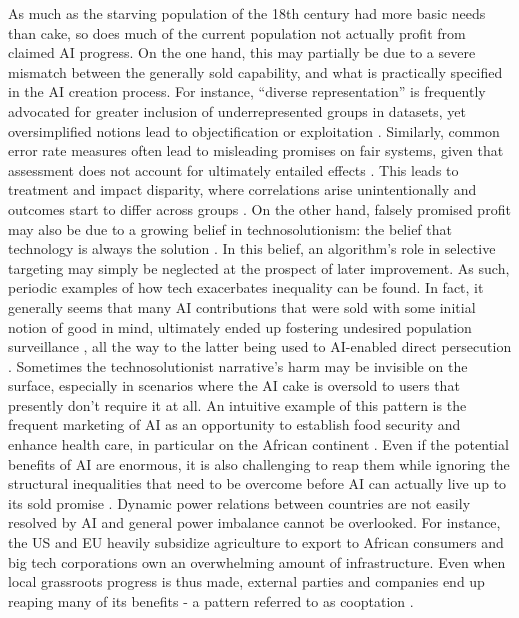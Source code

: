\documentclass[manuscript,screen,authorversion,nonacm]{acmart}
\begin{document}
As much as the starving population of the 18th century had more basic needs than cake, so does much of the current population not actually profit from claimed AI progress. On the one hand, this may partially be due to a severe mismatch between the generally sold capability, and what is practically specified in the AI creation process. For instance, ``diverse representation'' is frequently advocated for greater inclusion of underrepresented groups in datasets, yet oversimplified notions lead to objectification or exploitation \cite{Bergman2023RepresentationAIEval,Chien2024RepresentationalHarms}. Similarly, common error rate measures often lead to misleading promises on fair systems, given that assessment does not account for ultimately entailed effects \cite{Corbettdavies2023MismeasureFairness}. This leads to treatment and impact disparity, where correlations arise unintentionally and outcomes start to differ across groups \cite{Lipton2019MLDisparity}. On the  other hand, falsely promised profit may also be due to a growing belief in technosolutionism: the belief that technology is always the solution \cite{Broussard2019ArtificialUnintelligence}. In this belief, an algorithm's role in selective targeting may simply be neglected at the prospect of later improvement. As such, periodic examples of how tech exacerbates inequality can be found. In fact, it generally seems that many AI contributions that were sold with some initial notion of good in mind, ultimately ended up fostering undesired population surveillance \cite{Kalluri2023SurveillanceAIPipeline}, all the way to the latter being used to AI-enabled direct persecution \cite{Harwell2020Uighur}. 
Sometimes the technosolutionist narrative's harm may be invisible on the surface, especially in scenarios where the AI cake is oversold to users that presently don't require it at all. An intuitive example of this pattern is the frequent marketing of AI as an opportunity to establish food security and enhance health care, in particular on the African continent \cite{Arakpogun2021AIAfricaOppChall}. Even if the potential benefits of AI are enormous, it is also challenging to reap them while ignoring the structural inequalities that need to be overcome before AI can actually live up to its sold promise \cite{Ade-Ibijola2023AIAfricaChallenges}. Dynamic power relations between countries are not easily resolved by AI and general power imbalance cannot be overlooked. For instance, the US and EU heavily subsidize agriculture to export to African consumers \cite{Komminoth2023AIAfricaAgriculture} and big tech corporations own an overwhelming amount of infrastructure. Even when local grassroots progress is thus made, external parties and companies end up reaping many of its benefits - a pattern referred to as cooptation \cite{Mwema2024UnderseaAfrica}.  
\end{document}
